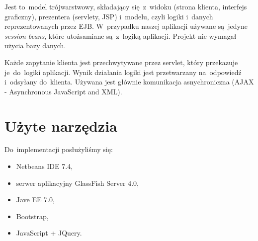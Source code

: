 \documentclass[11pt]{aghdpl}
\begin{document}
Jest to~model trójwarstwowy, składający się~z~widoku (strona klienta, interfejs graficzny), prezentera (servlety, JSP) i~modelu, czyli logiki i~danych reprezentowanych przez EJB. W~przypadku naszej aplikacji używane są~jedyne \textit{session beans}, które utożsamiane są~z~logiką aplikacji. Projekt nie wymagał użycia bazy danych.

Każde zapytanie klienta jest przechwytywane przez servlet, który przekazuje je~do~logiki aplikacji. Wynik działania logiki jest przetwarzany na~odpowiedź i~odsyłany do~klienta. Używana jest głównie komunikacja asnychroniczna (AJAX - Asynchronous JavaScript and XML).
\section{Użyte narzędzia}
Do~implementacji posłużyliśmy się:
\begin{itemize}
 \item Netbeans IDE 7.4,
 \item serwer aplikacyjny GlassFish Server 4.0,
 \item Jave EE 7.0,
 \item Bootstrap,
 \item JavaScript + JQuery.
\end{itemize}
\end{document}

